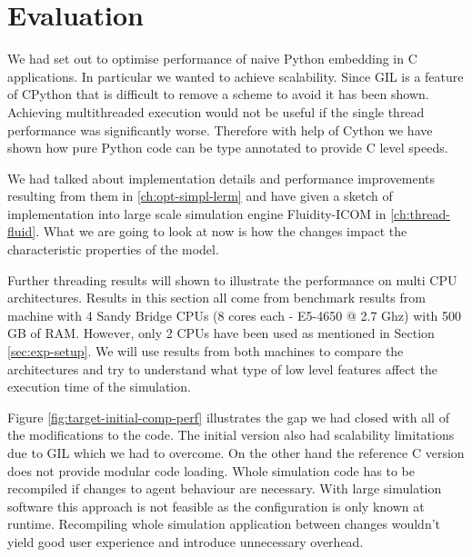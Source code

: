 \documentclass[12pt, a4paper]{report}
\begin{document}
\chapter{Evaluation}\label{ch:evaluation}

We had set out to optimise performance of naive Python embedding in C
applications. In particular we wanted to achieve scalability. Since
GIL is a feature of CPython that is difficult to remove a scheme
to avoid it has been shown. Achieving multithreaded execution would
not be useful if the single thread performance was significantly worse.
Therefore with help of Cython we have shown how pure Python code can
be type annotated to provide C level speeds.

We had talked about implementation details and performance
improvements resulting from them in \ref{ch:opt-simpl-lerm} and have
given a sketch of implementation into large scale simulation engine
Fluidity-ICOM in \ref{ch:thread-fluid}. What we are going to look
at now is how the changes impact the characteristic properties
of the model.

Further threading results will shown to illustrate the performance
on multi CPU architectures. Results in this section all come from
benchmark results from machine with 4 Sandy Bridge CPUs
(8 cores each - E5-4650 @ 2.7 Ghz) with 500 GB of RAM. However,
only 2 CPUs have been used as mentioned in Section \ref{sec:exp-setup}.
We will use results from both machines to compare the architectures and
try to understand what type of low level features affect the execution
time of the simulation.

Figure \ref{fig:target-initial-comp-perf} illustrates the gap we had
closed with all of the modifications to the code. The initial version
also had scalability limitations due to GIL which we had to overcome.
On the other hand the reference C version does not provide modular
code loading. Whole simulation code has to be recompiled if changes
to agent behaviour are necessary. With large simulation software
this approach is not feasible as the configuration is only known at
runtime. Recompiling whole simulation application between changes
wouldn't yield good user experience and introduce unnecessary overhead.
\end{document}
